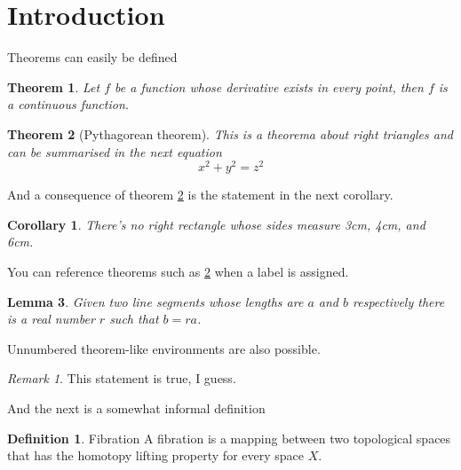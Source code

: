 \documentclass{article}
\newtheorem{theorem}{Theorem}[section]
\newtheorem{corollary}{Corollary}[theorem]
\newtheorem{lemma}[theorem]{Lemma}
\theoremstyle{definition}
\newtheorem{definition}{Definition}[section]
\theoremstyle{remark}
\newtheorem*{remark}{Remark}
\begin{document}
\section{Introduction}
Theorems can easily be defined
 
\begin{theorem}
Let $f$ be a function whose derivative exists in every point, then $f$ is 
a continuous function.
\end{theorem}
 
\begin{theorem}[Pythagorean theorem]
\label{pythagorean}
This is a theorema about right triangles and can be summarised in the next 
equation 
\[ x^2 + y^2 = z^2 \]
\end{theorem}
 
And a consequence of theorem \ref{pythagorean} is the statement in the next 
corollary.
 
\begin{corollary}
There's no right rectangle whose sides measure 3cm, 4cm, and 6cm.
\end{corollary}
 
You can reference theorems such as \ref{pythagorean} when a label is assigned.
 
\begin{lemma}
Given two line segments whose lengths are $a$ and $b$ respectively there is a 
real number $r$ such that $b=ra$.
\end{lemma}

Unnumbered theorem-like environments are also possible.
 
\begin{remark}
This statement is true, I guess.
\end{remark}
 
And the next is a somewhat informal definition
 
\begin{definition}{Fibration}
A fibration is a mapping between two topological spaces that has the homotopy lifting property for every space $X$.
\end{definition}
\end{document}
